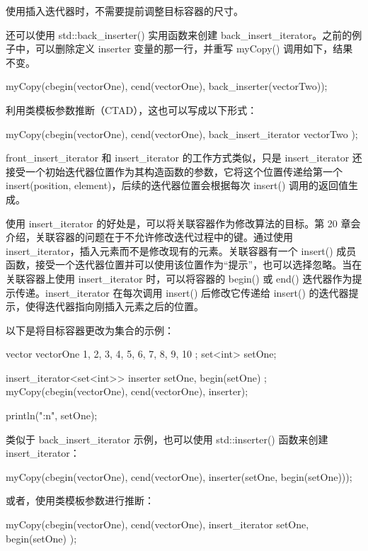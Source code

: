 使用插入迭代器时，不需要提前调整目标容器的尺寸。

还可以使用 std::back\_inserter() 实用函数来创建 back\_insert\_iterator。之前的例子中，可以删除定义 inserter 变量的那一行，并重写 myCopy() 调用如下，结果不变。

\begin{cpp}
myCopy(cbegin(vectorOne), cend(vectorOne), back_inserter(vectorTwo));
\end{cpp}

利用类模板参数推断（CTAD），这也可以写成以下形式：

\begin{cpp}
myCopy(cbegin(vectorOne), cend(vectorOne), back_insert_iterator { vectorTwo });
\end{cpp}

front\_insert\_iterator 和 insert\_iterator 的工作方式类似，只是 insert\_iterator 还接受一个初始迭代器位置作为其构造函数的参数，它将这个位置传递给第一个 insert(position, element)，后续的迭代器位置会根据每次 insert() 调用的返回值生成。

使用 insert\_iterator 的好处是，可以将关联容器作为修改算法的目标。第 20 章会介绍，关联容器的问题在于不允许修改迭代过程中的键。通过使用 insert\_iterator，插入元素而不是修改现有的元素。关联容器有一个 insert() 成员函数，接受一个迭代器位置并可以使用该位置作为“提示”，也可以选择忽略。当在关联容器上使用 insert\_iterator 时，可以将容器的 begin() 或 end() 迭代器作为提示传递。insert\_iterator 在每次调用 insert() 后修改它传递给 insert() 的迭代器提示，使得迭代器指向刚插入元素之后的位置。

以下是将目标容器更改为集合的示例：

\begin{cpp}
vector vectorOne { 1, 2, 3, 4, 5, 6, 7, 8, 9, 10 };
set<int> setOne;

insert_iterator<set<int>> inserter { setOne, begin(setOne) };
myCopy(cbegin(vectorOne), cend(vectorOne), inserter);

println("{:n}", setOne);
\end{cpp}

类似于 back\_insert\_iterator 示例，也可以使用 std::inserter() 函数来创建 insert\_iterator：

\begin{cpp}
myCopy(cbegin(vectorOne), cend(vectorOne), inserter(setOne, begin(setOne)));
\end{cpp}

或者，使用类模板参数进行推断：

\begin{cpp}
myCopy(cbegin(vectorOne), cend(vectorOne),
    insert_iterator { setOne, begin(setOne) });
\end{cpp}

